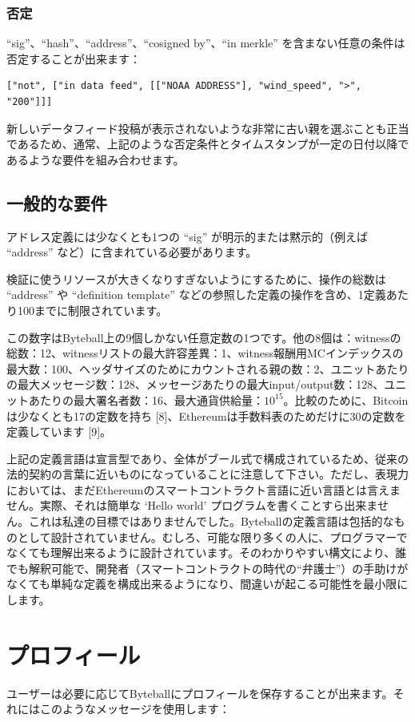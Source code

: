 \documentclass[a4paper, dvipdfmx]{jsarticle}
\begin{document}
\subsubsection{否定}
“sig”、“hash”、“address”、“cosigned by”、“in merkle” を含まない任意の条件は否定することが出来ます：

\begin{lstlisting}[basicstyle=\ttfamily\footnotesize, frame=none]
["not", ["in data feed", [["NOAA ADDRESS"], "wind_speed", ">",
"200"]]]
\end{lstlisting}

\noindent 新しいデータフィード投稿が表示されないような非常に古い親を選ぶことも正当であるため、通常、上記のような否定条件とタイムスタンプが一定の日付以降であるような要件を組み合わせます。


\subsection{一般的な要件}
アドレス定義には少なくとも1つの “sig” が明示的または黙示的（例えば “address” など）に含まれている必要があります。

検証に使うリソースが大きくなりすぎないようにするために、操作の総数は “address” や “definition template” などの参照した定義の操作を含め、1定義あたり100までに制限されています。

この数字はByteball上の9個しかない任意定数の1つです。他の8個は：witnessの総数：12、witnessリストの最大許容差異：1、witness報酬用MCインデックスの最大数：100、ヘッダサイズのためにカウントされる親の数：2、ユニットあたりの最大メッセージ数：128、メッセージあたりの最大input/output数：128、ユニットあたりの最大署名者数：16、最大通貨供給量：$10^{15}$。比較のために、Bitcoinは少なくとも17の定数を持ち [8]、Ethereumは手数料表のためだけに30の定数を定義しています [9]。

上記の定義言語は宣言型であり、全体がブール式で構成されているため、従来の法的契約の言葉に近いものになっていることに注意して下さい。ただし、表現力においては、まだEthereumのスマートコントラクト言語に近い言語とは言えません。実際、それは簡単な ‘Hello world’ プログラムを書くことすら出来ません。これは私達の目標ではありませんでした。Byteballの定義言語は包括的なものとして設計されていません。むしろ、可能な限り多くの人に、プログラマーでなくても理解出来るように設計されています。そのわかりやすい構文により、誰でも解釈可能で、開発者（スマートコントラクトの時代の“弁護士”）の手助けがなくても単純な定義を構成出来るようになり、間違いが起こる可能性を最小限にします。


\section{プロフィール}
ユーザーは必要に応じてByteballにプロフィールを保存することが出来ます。それにはこのようなメッセージを使用します：
\end{document}
